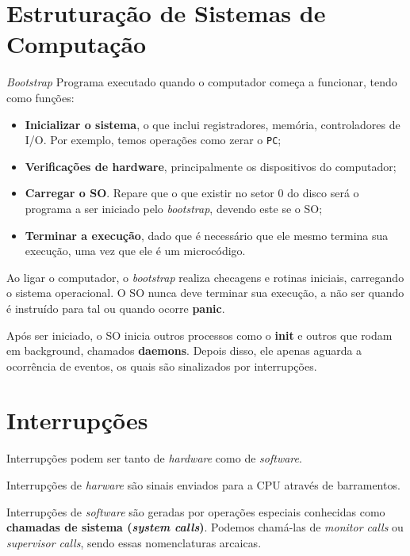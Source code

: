 \section{Estruturação de Sistemas de Computação}
\begin{definicao}{\textit{Bootstrap}}
  Programa executado quando o computador começa a funcionar, tendo como funções:
  \begin{itemize}
    \item \textbf{Inicializar o sistema}, o que inclui registradores, memória, controladores de I/O. Por exemplo, temos operações como zerar o \texttt{PC};
    \item \textbf{Verificações de hardware}, principalmente os dispositivos do computador;
    \item \textbf{Carregar o SO}. Repare que o que existir no setor 0 do disco será o programa a ser iniciado pelo \textit{bootstrap}, devendo este se o SO;
    \item \textbf{Terminar a execução}, dado que é necessário que ele mesmo termina sua execução, uma vez que ele é um microcódigo.
  \end{itemize}
\end{definicao}

Ao ligar o computador, o \textit{bootstrap} realiza checagens e rotinas iniciais, carregando o sistema operacional. O SO nunca deve terminar sua execução, a não ser quando é instruído para tal ou quando ocorre \textbf{panic}.

Após ser iniciado, o SO inicia outros processos como o \textbf{init} e outros que rodam em background, chamados \textbf{daemons}. Depois disso, ele apenas aguarda a ocorrência de eventos, os quais são sinalizados por interrupções.


















\section{Interrupções}
Interrupções podem ser tanto de \textit{hardware} como de \textit{software}.

Interrupções de \textit{harware} são sinais enviados para a CPU através de barramentos.

Interrupções de \textit{software} são geradas por operações especiais conhecidas como \textbf{chamadas de sistema (\textit{system calls})}. Podemos chamá-las de \textit{monitor calls} ou \textit{supervisor calls}, sendo essas nomenclaturas arcaicas.

